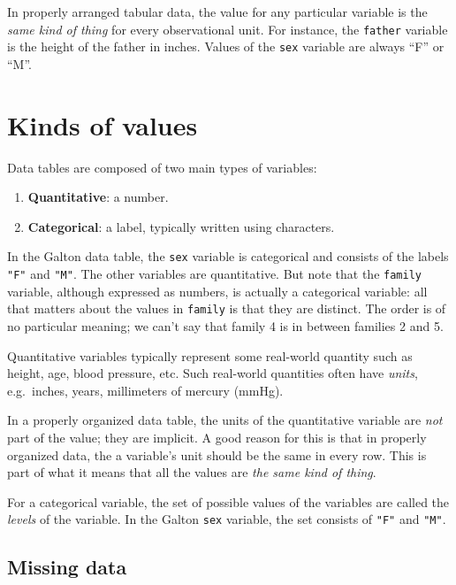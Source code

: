 \documentclass[]{book}
\providecommand{\tightlist}{%
  \setlength{\itemsep}{0pt}\setlength{\parskip}{0pt}}
\theoremstyle{definition}
\theoremstyle{definition}
\theoremstyle{definition}
\theoremstyle{remark}
\begin{document}
In properly arranged tabular data, the value for any particular variable
is the \emph{same kind of thing} for every observational unit. For
instance, the \texttt{father} variable is the height of the father in
inches. Values of the \texttt{sex} variable are always ``F'' or ``M''.

\section{Kinds of values}\label{kinds-of-values}

Data tables are composed of two main types of variables:

\begin{enumerate}
\def\labelenumi{\arabic{enumi}.}
\tightlist
\item
  \textbf{Quantitative}: a number.
\item
  \textbf{Categorical}: a label, typically written using characters.
\end{enumerate}

In the Galton data table, the \texttt{sex} variable is categorical and
consists of the labels \texttt{"F"} and \texttt{"M"}. The other
variables are quantitative. But note that the \texttt{family} variable,
although expressed as numbers, is actually a categorical variable: all
that matters about the values in \texttt{family} is that they are
distinct. The order is of no particular meaning; we can't say that
family 4 is in between families 2 and 5.

Quantitative variables typically represent some real-world quantity such
as height, age, blood pressure, etc. Such real-world quantities often
have \emph{units}, e.g.~inches, years, millimeters of mercury (mmHg).

In a properly organized data table, the units of the quantitative
variable are \emph{not} part of the value; they are implicit. A good
reason for this is that in properly organized data, the a variable's
unit should be the same in every row. This is part of what it means that
all the values are \emph{the same kind of thing}.

For a categorical variable, the set of possible values of the variables
are called the \emph{levels} of the variable. In the Galton \texttt{sex}
variable, the set consists of \texttt{"F"} and \texttt{"M"}.

\subsection{Missing data}\label{missing-data}
\end{document}
